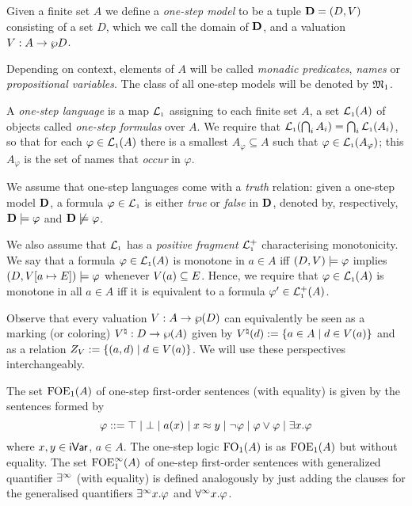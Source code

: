 
\begin{definition}
Given a finite set $A$
we define a \emph{one-step model} to be a tuple $\mathbf{D} = (D,V)$
consisting of a set $D$,  which we call the domain of $\mathbf{D}$, 
and a valuation $V: A \to \wp D$.

Depending on context, elements of $A$ will be called \emph{monadic predicates}, \emph{names}
or \emph{propositional variables}. The class of all one-step models will be denoted by $\mathfrak{M}_1$.


A \emph{one-step language} is a map $\mathcal{L}_{\scriptscriptstyle 1}$ assigning to each finite set $A$, a set $\mathcal{L}_{\scriptscriptstyle 1}(A)$ of objects called \emph{one-step formulas} over $A$.
We require that $\mathcal{L}_{\scriptscriptstyle 1}(\bigcap_{i} A_{i}) = \bigcap_{i} \mathcal{L}_{\scriptscriptstyle 1}(A_{i})$,
so that for each $\varphi \in \mathcal{L}_{\scriptscriptstyle 1}(A)$ there is a smallest $A_{\varphi} \subseteq A$ such
that $\varphi \in \mathcal{L}_{\scriptscriptstyle 1}(A_{\varphi})$; this $A_{\varphi}$ is the set of names that \emph{occur} in $\varphi$.

We assume that one-step languages come with a \emph{truth}
relation: given a one-step model $\mathbf{D}$, a formula $\varphi \in \mathcal{L}_{\scriptscriptstyle 1}$
is either \emph{true} or \emph{false} in $\mathbf{D}$, denoted by,
respectively, $\mathbf{D} \models \varphi$ and $\mathbf{D} \not\models \varphi$.
%

We also assume that $\mathcal{L}_{\scriptscriptstyle 1}$ has a \emph{positive fragment} $\mathcal{L}_{\scriptscriptstyle 1}^+$
characterising monotonicity. We say that a formula $\varphi \in \mathcal{L}_{\scriptscriptstyle 1}(A)$ is
monotone in $a\in A$ iff $(D,V) \models \varphi$ implies $(D,V[a\mapsto E]) \models \varphi$ whenever $V(a) \subseteq E$. Hence, we require that $\varphi \in \mathcal{L}_{\scriptscriptstyle 1}(A)$ is
monotone in all $a\in A$ iff it is equivalent to a formula $\varphi' \in \mathcal{L}_{\scriptscriptstyle 1}^+(A)$.
\end{definition}


Observe that every valuation $V: A \to \wp (D)$ can equivalently be seen as a marking (or coloring) $V^\natural:D \to \wp(A)$ given by $V^\natural(d) := \{a \in A \mid d \in V(a)\}$ and as a relation $Z_V := \{ (a,d) \mid d\in V(a)\}$.
We will use these perspectives interchangeably.


\begin{definition}
The set $\mathrm{FOE}_1(A)$ of one-step first-order sentences (with equality) is given by the sentences formed by
\[
\varphi ::=
\top \mid \bot 
\mid a(x)
\mid x \approx y
\mid \neg \varphi
\mid \varphi \lor \varphi
\mid \exists x.\varphi
\]
where $x,y\in \mathsf{iVar}$, $a \in A$. The one-step logic $\mathrm{FO}_1(A)$ is as $\mathrm{FOE}_1(A)$ but without equality.
The set $\mathrm{FOE}^{\infty}_1(A)$ of one-step first-order sentences with generalized quantifier $\exists^\infty$ (with equality)
is defined analogously by just adding the clauses for the generalised quantifiers $\exists^\infty x. \varphi$ and $\forall^\infty x. \varphi$.
\end{definition}

